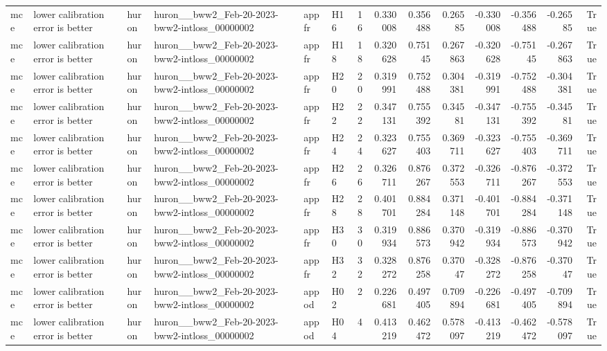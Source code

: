 \begin{longtable}{llllllrrrrrrrr}
mce & lower calibration error is better & huron & huron\_\_bww2\_Feb-20-2023-bww2-intloss\_00000002 & appfr & H16 & 16 & 0.330008 & 0.356488 & 0.26585 & -0.330008 & -0.356488 & -0.26585 & True \\
mce & lower calibration error is better & huron & huron\_\_bww2\_Feb-20-2023-bww2-intloss\_00000002 & appfr & H18 & 18 & 0.320628 & 0.75145 & 0.267863 & -0.320628 & -0.75145 & -0.267863 & True \\
mce & lower calibration error is better & huron & huron\_\_bww2\_Feb-20-2023-bww2-intloss\_00000002 & appfr & H20 & 20 & 0.319991 & 0.752488 & 0.304381 & -0.319991 & -0.752488 & -0.304381 & True \\
mce & lower calibration error is better & huron & huron\_\_bww2\_Feb-20-2023-bww2-intloss\_00000002 & appfr & H22 & 22 & 0.347131 & 0.755392 & 0.34581 & -0.347131 & -0.755392 & -0.34581 & True \\
mce & lower calibration error is better & huron & huron\_\_bww2\_Feb-20-2023-bww2-intloss\_00000002 & appfr & H24 & 24 & 0.323627 & 0.755403 & 0.369711 & -0.323627 & -0.755403 & -0.369711 & True \\
mce & lower calibration error is better & huron & huron\_\_bww2\_Feb-20-2023-bww2-intloss\_00000002 & appfr & H26 & 26 & 0.326711 & 0.876267 & 0.372553 & -0.326711 & -0.876267 & -0.372553 & True \\
mce & lower calibration error is better & huron & huron\_\_bww2\_Feb-20-2023-bww2-intloss\_00000002 & appfr & H28 & 28 & 0.401701 & 0.884284 & 0.371148 & -0.401701 & -0.884284 & -0.371148 & True \\
mce & lower calibration error is better & huron & huron\_\_bww2\_Feb-20-2023-bww2-intloss\_00000002 & appfr & H30 & 30 & 0.319934 & 0.886573 & 0.370942 & -0.319934 & -0.886573 & -0.370942 & True \\
mce & lower calibration error is better & huron & huron\_\_bww2\_Feb-20-2023-bww2-intloss\_00000002 & appfr & H32 & 32 & 0.328272 & 0.876258 & 0.37047 & -0.328272 & -0.876258 & -0.37047 & True \\
mce & lower calibration error is better & huron & huron\_\_bww2\_Feb-20-2023-bww2-intloss\_00000002 & appod & H02 & 2 & 0.226681 & 0.497405 & 0.709894 & -0.226681 & -0.497405 & -0.709894 & True \\
mce & lower calibration error is better & huron & huron\_\_bww2\_Feb-20-2023-bww2-intloss\_00000002 & appod & H04 & 4 & 0.413219 & 0.462472 & 0.578097 & -0.413219 & -0.462472 & -0.578097 & True \\

\end{longtable}
